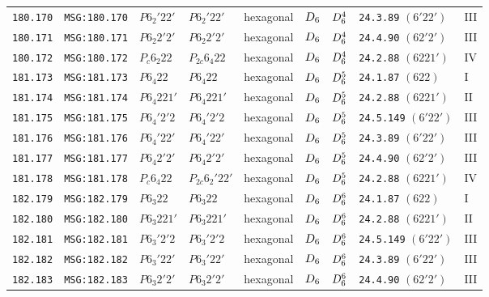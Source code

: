 \documentclass[fleqn,10pt]{jsarticle}
\begin{document}
\begin{center}
\begin{longtable}{lllllllll}
\texttt{180.170} & \texttt{MSG:180.170} & $P6_{2}'22'$ & $P6_{2}'22'$ & hexagonal & $D_{\rm 6}$ & $D_{\rm 6}^{4}$ & \texttt{24.3.89} $(6'22')$ & III \\
\texttt{180.171} & \texttt{MSG:180.171} & $P6_{2}2'2'$ & $P6_{2}2'2'$ & hexagonal & $D_{\rm 6}$ & $D_{\rm 6}^{4}$ & \texttt{24.4.90} $(62'2')$ & III \\
\texttt{180.172} & \texttt{MSG:180.172} & $P_{c}6_{2}22$ & $P_{2c}6_{4}22$ & hexagonal & $D_{\rm 6}$ & $D_{\rm 6}^{4}$ & \texttt{24.2.88} $(6221')$ & IV \\ \hline
\texttt{181.173} & \texttt{MSG:181.173} & $P6_{4}22$ & $P6_{4}22$ & hexagonal & $D_{\rm 6}$ & $D_{\rm 6}^{5}$ & \texttt{24.1.87} $(622)$ & I \\
\texttt{181.174} & \texttt{MSG:181.174} & $P6_{4}221'$ & $P6_{4}221'$ & hexagonal & $D_{\rm 6}$ & $D_{\rm 6}^{5}$ & \texttt{24.2.88} $(6221')$ & II \\
\texttt{181.175} & \texttt{MSG:181.175} & $P6_{4}'2'2$ & $P6_{4}'2'2$ & hexagonal & $D_{\rm 6}$ & $D_{\rm 6}^{5}$ & \texttt{24.5.149} $(6'22')$ & III \\
\texttt{181.176} & \texttt{MSG:181.176} & $P6_{4}'22'$ & $P6_{4}'22'$ & hexagonal & $D_{\rm 6}$ & $D_{\rm 6}^{5}$ & \texttt{24.3.89} $(6'22')$ & III \\
\texttt{181.177} & \texttt{MSG:181.177} & $P6_{4}2'2'$ & $P6_{4}2'2'$ & hexagonal & $D_{\rm 6}$ & $D_{\rm 6}^{5}$ & \texttt{24.4.90} $(62'2')$ & III \\
\texttt{181.178} & \texttt{MSG:181.178} & $P_{c}6_{4}22$ & $P_{2c}6_{2}'22'$ & hexagonal & $D_{\rm 6}$ & $D_{\rm 6}^{5}$ & \texttt{24.2.88} $(6221')$ & IV \\ \hline
\texttt{182.179} & \texttt{MSG:182.179} & $P6_{3}22$ & $P6_{3}22$ & hexagonal & $D_{\rm 6}$ & $D_{\rm 6}^{6}$ & \texttt{24.1.87} $(622)$ & I \\
\texttt{182.180} & \texttt{MSG:182.180} & $P6_{3}221'$ & $P6_{3}221'$ & hexagonal & $D_{\rm 6}$ & $D_{\rm 6}^{6}$ & \texttt{24.2.88} $(6221')$ & II \\
\texttt{182.181} & \texttt{MSG:182.181} & $P6_{3}'2'2$ & $P6_{3}'2'2$ & hexagonal & $D_{\rm 6}$ & $D_{\rm 6}^{6}$ & \texttt{24.5.149} $(6'22')$ & III \\
\texttt{182.182} & \texttt{MSG:182.182} & $P6_{3}'22'$ & $P6_{3}'22'$ & hexagonal & $D_{\rm 6}$ & $D_{\rm 6}^{6}$ & \texttt{24.3.89} $(6'22')$ & III \\
\texttt{182.183} & \texttt{MSG:182.183} & $P6_{3}2'2'$ & $P6_{3}2'2'$ & hexagonal & $D_{\rm 6}$ & $D_{\rm 6}^{6}$ & \texttt{24.4.90} $(62'2')$ & III \\

\end{longtable}
\end{center}
\end{document}
